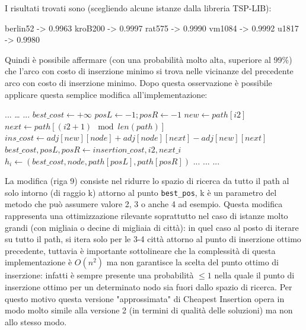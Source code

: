 \documentclass[a4paper,12pt]{report}
\begin{document}
I risultati trovati sono (scegliendo alcune istanze dalla libreria TSP-LIB):
\begin{myverbatim}
berlin52 -> 0.9963
kroB200 -> 0.9997
rat575 -> 0.9990
vm1084 -> 0.9992
u1817 -> 0.9980
\end{myverbatim}
Quindi è possibile affermare (con una probabilità molto alta, superiore al 99\%) che l'arco con costo di inserzione minimo si trova nelle vicinanze del precedente arco con costo di inserzione minimo. Dopo questa osservazione è possibile applicare questa semplice modifica all'implementazione:
\begin{tcolorbox}[colframe=black, colback=white, boxrule=0.5pt, title=Cheapest Insertion Versione 2 Approssimata, coltitle=black, fonttitle=\bfseries, colbacktitle=white, breakable]
  \begin{algorithmic}[1]
    \State ...
      \State \dots
        \State ...
          \State $best\_cost \gets +\infty$
          \State $posL \gets -1; posR \gets -1$
            \State $new \gets path[i2]$
            \State $next \gets path[(i2 + 1) \mod len(path)]$
            \State $ins\_cost \gets adj[new][node] + adj[node][next] - adj[new][next]$
              \State $best\_cost, posL, posR \gets insertion\_cost, i2, next\_i$
            \EndIf
          \EndFor
          \State $h_i \gets (best\_cost, node, path[posL], path[posR])$
        \EndIf
        \State ...
      \EndFor
      \State ...
    \EndWhile
    \State ...
  \end{algorithmic}
\end{tcolorbox}
La modifica (riga 9) consiste nel ridurre lo spazio di ricerca da tutto il path al solo intorno (di raggio k) attorno al punto \lstinline!best_pos!, k è un parametro del metodo che può assumere valore 2, 3 o anche 4 ad esempio. Questa modifica rappresenta una ottimizzazione rilevante soprattutto nel caso di istanze molto grandi (con migliaia o decine di migliaia di città): in quel caso al posto di iterare su tutto il path, si itera solo per le 3-4 città attorno al punto di inserzione ottimo precedente, tuttavia è importante sottolineare che la complessità di questa implementazione è $O(n^2)$ ma non garantisce la scelta del punto ottimo di inserzione: infatti è sempre presente una probabilità $\leq 1$ nella quale il punto di inserzione ottimo per un determinato nodo sia fuori dallo spazio di ricerca. Per questo motivo questa versione "approssimata" di Cheapest Insertion opera in modo molto simile alla versione 2 (in termini di qualità delle soluzioni) ma non allo stesso modo.
\end{document}
